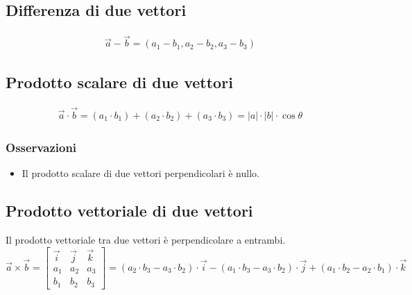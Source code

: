 \subsection{Differenza di due vettori}
\begin{displaymath}\begin{aligned}
	\vec{a} - \vec{b} = (a_1 - b_1, a_2 - b_2, a_3 - b_3)
\end{aligned}\end{displaymath}

\subsection{Prodotto scalare di due vettori}
\begin{displaymath}\begin{aligned}
	\vec{a} \cdot \vec{b} = (a_1 \cdot b_1) + (a_2 \cdot b_2) + (a_3 \cdot b_3) = |a| \cdot |b| \cdot \cos{\theta}
\end{aligned}\end{displaymath}
\subsubsection{Osservazioni}
\begin{itemize}
   	\item{Il prodotto scalare di due vettori perpendicolari è nullo.}
\end{itemize}

\subsection{Prodotto vettoriale di due vettori}
Il prodotto vettoriale tra due vettori è perpendicolare a entrambi.
\begin{displaymath}
   	\vec{a} \times \vec{b} = 
    \begin{bmatrix}
   		\vec{i} & \vec{j} & \vec{k}\\
       	a_1 & a_2 & a_3 \\
       	b_1 & b_2 & b_3
   	\end{bmatrix} =
    (a_2 \cdot b_3 - a_3 \cdot b_2) \cdot \vec{i}
    - (a_1 \cdot b_3 - a_3 \cdot b_2) \cdot \vec{j}
    + (a_1 \cdot b_2 - a_2 \cdot b_1) \cdot \vec{k}
\end{displaymath}

